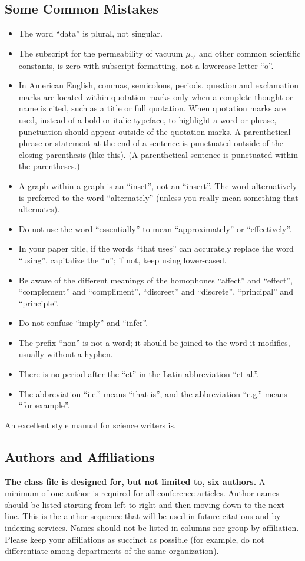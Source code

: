\documentclass[conference]{IEEEtran}
\begin{document}
\subsection{Some Common Mistakes}\label{SCM}
\begin{itemize}
\item The word ``data'' is plural, not singular.
\item The subscript for the permeability of vacuum $\mu_{0}$, and other common scientific constants, is zero with subscript formatting, not a lowercase letter ``o''.
\item In American English, commas, semicolons, periods, question and exclamation marks are located within quotation marks only when a complete thought or name is cited, such as a title or full quotation. When quotation marks are used, instead of a bold or italic typeface, to highlight a word or phrase, punctuation should appear outside of the quotation marks. A parenthetical phrase or statement at the end of a sentence is punctuated outside of the closing parenthesis (like this). (A parenthetical sentence is punctuated within the parentheses.)
\item A graph within a graph is an ``inset'', not an ``insert''. The word alternatively is preferred to the word ``alternately'' (unless you really mean something that alternates).
\item Do not use the word ``essentially'' to mean ``approximately'' or ``effectively''.
\item In your paper title, if the words ``that uses'' can accurately replace the word ``using'', capitalize the ``u''; if not, keep using lower-cased.
\item Be aware of the different meanings of the homophones ``affect'' and ``effect'', ``complement'' and ``compliment'', ``discreet'' and ``discrete'', ``principal'' and ``principle''.
\item Do not confuse ``imply'' and ``infer''.
\item The prefix ``non'' is not a word; it should be joined to the word it modifies, usually without a hyphen.
\item There is no period after the ``et'' in the Latin abbreviation ``et al.''.
\item The abbreviation ``i.e.'' means ``that is'', and the abbreviation ``e.g.'' means ``for example''.
\end{itemize}
An excellent style manual for science writers is.

\subsection{Authors and Affiliations}
\textbf{The class file is designed for, but not limited to, six authors.} A 
minimum of one author is required for all conference articles. Author names 
should be listed starting from left to right and then moving down to the 
next line. This is the author sequence that will be used in future citations 
and by indexing services. Names should not be listed in columns nor group by 
affiliation. Please keep your affiliations as succinct as possible (for 
example, do not differentiate among departments of the same organization).
\end{document}
